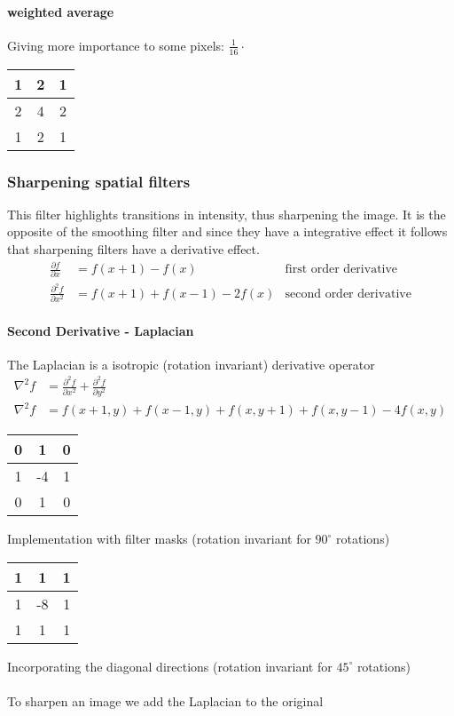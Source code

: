 \paragraph{weighted average}
Giving more importance to some pixels:
$ \frac{1}{16} \cdot$ \begin{tabular}{|c|c|c|} \hline 1 & 2 & 1 \\ \hline 2 & 4 & 2 \\ \hline 1 & 2 & 1  \\ \hline \end{tabular}
\subsubsection{Sharpening spatial filters }

This filter highlights transitions in intensity, thus sharpening the image.
It is the opposite of the smoothing filter and since they have a integrative effect it follows that sharpening filters have a derivative effect.
\begin{align}
\frac{\partial f}{\partial x} &= f(x+1) - f(x)& \text{first order derivative} \\
\frac{\partial^2 f}{\partial x^2} &= f(x+1) + f(x-1)  -2 f(x)& \text{second order derivative}
\end{align}

\paragraph{Second Derivative - Laplacian }
The Laplacian is a isotropic (rotation invariant) derivative operator
\begin{align}
\nabla^2f &= \frac{\partial^2 f}{\partial x^2} + \frac{\partial^2 f}{\partial y^2} \\
\nabla^2f &= f(x+1,y) + f(x-1,y) + f(x,y+1) + f(x,y-1) - 4 f(x,y)
\end{align}

\begin{tabular}{|c|c|c|} \hline
0 & 1 & 0  \\ \hline
1 &-4 & 1  \\ \hline
0 & 1 & 0  \\ \hline
\end{tabular}
Implementation with filter masks (rotation invariant for $90^\circ$ rotations) \\ \vspace{3mm}

\begin{tabular}{|c|c|c|} \hline
1 & 1 & 1 \\ \hline
1 &-8 & 1 \\ \hline
1 & 1 & 1 \\ \hline
\end{tabular}
Incorporating the diagonal directions (rotation invariant for $45^\circ$ rotations)
\\ \\
To sharpen an image we add the Laplacian to the original

